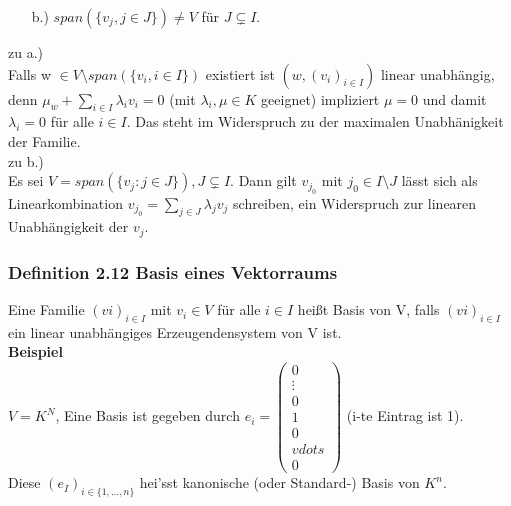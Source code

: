 \documentclass{scrartcl}
\newcommand{\lb}{\lambda}
\newcommand{\ve}[1]{{\begin{pmatrix}#1 \end{pmatrix}}}
\begin{document}
\begin{itemize}
{\begin{itemize}
\item[b.)]{\(span(\{v_j, j \in J\}) \neq V\) f\"ur \(J \subsetneq I\).}
\end{itemize}
zu a.)\\
Falls w  \(\in V \setminus span(\{v_i, i \in I\})\) existiert ist \((w, (v_i)_{i \in I})\) linear unabh\"angig, denn \(\mu_w + \sum_{i \in I} \lb_i v_i = 0\) (mit \(\lb_i, \mu \in K\) geeignet) impliziert \(\mu = 0\) und damit \(\lb_i = 0\) f\"ur alle \(i \in I\). Das steht im Widerspruch zu der maximalen Unabh\"anigkeit der Familie.\\
zu b.)\\
Es sei \(V = span(\{v_j : j \in J\}), J \subsetneq I\). Dann gilt \(v_{j_0}\) mit \(j_0 \in I \setminus J\) l\"asst sich als Linearkombination \(v_{j_0} = \sum_{j \in J} \lb_j v_j\) schreiben, ein Widerspruch zur linearen Unabh\"angigkeit der \(v_j\).
}
\end{itemize}

\subsubsection{Definition 2.12 Basis eines Vektorraums}
Eine Familie \((vi)_{i\in I}\) mit \(v_i \in V\) f\"ur alle \(i \in I\) hei\ss{}t Basis von V, falls \((vi)_{i\in I}\) ein linear unabh\"angiges Erzeugendensystem von V ist.\\
\textbf{Beispiel}\\
\(V = K^N\), Eine Basis ist gegeben durch \(e_i = \ve{0\\\vdots\\0\\1\\0\\vdots\\0}\) (i-te Eintrag ist 1).\\
Diese \((e_I)_{i \in \{1, \dots, n\}}\) hei'ss{}t kanonische (oder Standard-) Basis von \(K^n\).
\end{document}
